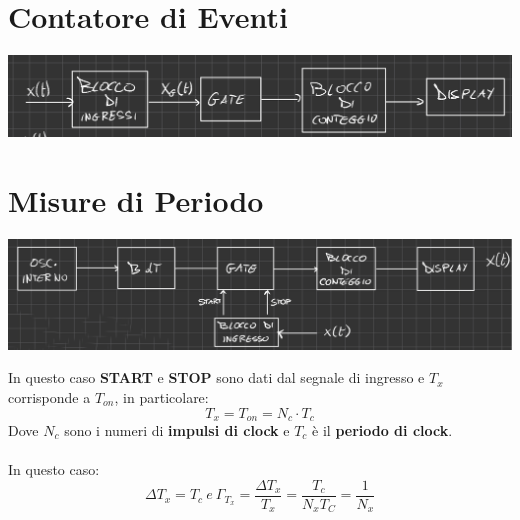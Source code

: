 \section{Contatore di Eventi}
\begin{center}
    \includegraphics[width=\textwidth]{Images/figure11.png}
\end{center}
\section{Misure di Periodo}
\begin{center}
    \includegraphics[width=\textwidth]{Images/figure13.png}
\end{center}
In questo caso \textbf{START} e \textbf{STOP} sono dati dal segnale di ingresso e $T_x$ corrisponde a $T_{on}$, in particolare:
\begin{equation*}
    T_x = T_{on} = N_c \cdot T_c
\end{equation*}
Dove $N_c$ sono i numeri di \textbf{impulsi di clock} e $T_c$ è il \textbf{periodo di clock}.\\ \\
In questo caso:
\begin{equation*}
    \Delta T_x = T_c \ e \ \Gamma_{T_x} = \frac{\Delta T_x}{T_x} = \frac{T_c}{N_x T_C} = \frac{1}{N_x}
\end{equation*}
